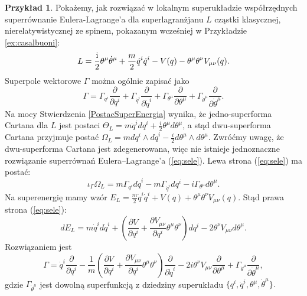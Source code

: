 \documentclass[11pt,a4paper]{report}
\theoremstyle{definition}
\newtheorem{example}[theorem]{Przykład}
\begin{document}
\begin{example}
	\label{ex:superfield}
	Pokażemy, jak rozwiązać w lokalnym superukładzie współrzędnych superrównanie Eulera-Lagrange'a dla superlagranżjanu $L$ cząstki klasycznej, nierelatywistycznej ze spinem, pokazanym wcześniej w Przykładzie \ref{ex:casalbuoni}:
	\begin{equation*}
		L = \frac{\rm i}{2} \theta^\mu \dot{\theta}^\mu + \frac{m}{2} \dot{q}^i \dot{q}^i   - V({q}) - \theta^\mu \theta^\nu V_{\mu \nu} ({q}).
	\end{equation*}
	Superpole wektorowe $\Gamma$ można ogólnie zapisać jako $$\Gamma= \Gamma_{q^i} \frac{\partial}{\partial q^i} + \Gamma_{\dot q^i} \frac{\partial}{\partial \dot q^i} + \Gamma_{\theta^\mu} \frac{\partial}{\partial \theta^\mu} + \Gamma_{\dot \theta^\mu} \frac{\partial}{\partial \dot \theta^\mu}.$$ Na mocy Stwierdzenia \ref{PostacSuperEnergia} wynika, \.ze jedno-superforma Cartana dla $L$ jest postaci $\Theta_L = m \dot q^i dq^i + \frac{i}{2} \theta^\mu d \theta^\mu$, a stąd dwu-superforma Cartana przyjmuje postać $\Omega_L = m dq^i \wedge d\dot q^i - \frac{i}{2} d\theta^\mu \wedge d\theta^\mu$. Zwróćmy uwagę, że dwu-superforma Cartana jest zdegenerowana, więc nie istnieje jednoznaczne rozwiązanie superr\'owna\'n Eulera--Lagrange'a (\ref{eq:sele}). Lewa strona (\ref{eq:sele}) ma postać:
	\begin{equation*}
		\iota_{\Gamma} \Omega_L = m \Gamma_{q^i} d \dot q^i - m \Gamma_{\dot q^i} dq^i - i\Gamma_{\theta^\mu} d \theta^\mu.
	\end{equation*}
	Na superenergię mamy wzór $E_L = \frac{m}{2} \dot q^i \dot q^i + V({q}) + \theta^\mu \theta^\nu V_{\mu \nu}({q}).$ Stąd prawa strona (\ref{eq:sele}):
	\begin{equation*}
		dE_L = m \dot q^i d \dot q^i + \left( \frac{\partial V}{\partial q^i} + \frac{\partial V_{\mu \nu}}{\partial q^i} \theta^\mu \theta^\nu \right)dq^i - 2 \theta^\nu V_{\mu \nu} d\theta^\mu.
	\end{equation*}
	Rozwiązaniem jest
	\begin{equation*}
		\Gamma = \dot{q}^i \frac{\partial}{\partial q^i} - \frac{1}{m} \left( \frac{\partial V}{\partial q^i} + \frac{\partial V_{\mu \nu}}{\partial q^i} \theta^\mu \theta^\nu \right) \frac{\partial}{\partial \dot q^i} - 2i \theta^\nu V_{\mu \nu} \frac{\partial}{\partial \theta^\mu} + \Gamma_{\dot \theta^\mu} \frac{\partial}{\partial \dot \theta^\mu},
	\end{equation*}
	gdzie $\Gamma_{\dot \theta^\mu}$ jest dowolną superfunkcją z dziedziny superukładu $\{ q^i, \dot q^i, \theta^\mu, \dot \theta^\mu \}.$ 
						      					

\end{example}
\end{document}
